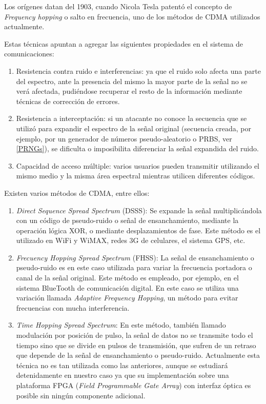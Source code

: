 Los orígenes datan del 1903, cuando Nicola Tesla patentó el concepto de \textit{Frequency hopping} o salto en frecuencia, uno de los métodos de CDMA utilizados actualmente.

Estas técnicas apuntan a agregar las siguientes propiedades en el sistema de comunicaciones:
\begin{enumerate} 
\item Resistencia contra ruido e interferencias: ya que el ruido solo afecta una parte del espectro, ante la presencia del mismo la mayor parte de la señal no se verá afectada, pudiéndose recuperar el resto de la información mediante técnicas de corrección de errores.
\item Resistencia a interceptación: si un atacante no conoce la secuencia que se utilizó para expandir el espectro de la señal original (secuencia creada, por ejemplo, por un generador de números pseudo-aleatorio o PRBS, ver \ref{PRNGs}), se dificulta o imposibilita diferenciar la señal expandida del ruido.
\item Capacidad de acceso múltiple: varios usuarios pueden transmitir utilizando el mismo medio y la misma área espectral mientras utilicen diferentes códigos.
\end{enumerate} 

Existen varios métodos de CDMA, entre ellos:
\begin{enumerate} 
\item \textit{Direct Sequence Spread Spectrum} (DSSS): Se expande la señal multiplicándola con un código de pseudo-ruido o señal de ensanchamiento, mediante la operación lógica XOR, o mediante desplazamientos de fase. Este método es el utilizado en WiFi y WiMAX, redes 3G de celulares, el sistema GPS, etc.
\item \textit{Frecuency Hopping Spread Spectrum} (FHSS): La señal de ensanchamiento o pseudo-ruido es en este caso utilizada para variar la frecuencia portadora o canal de la señal original. Este método es empleado, por ejemplo, en el sistema BlueTooth de comunicación digital. En este caso se utiliza una variación llamada \textit{Adaptive Frequency Hopping}, un método para evitar frecuencias con mucha interferencia.
\item \textit{Time Hopping Spread Spectrum}: En este método, también llamado modulación por posición de pulso, la señal de datos no se transmite todo el tiempo sino que se divide en pulsos de transmisión, que sufren de un retraso que depende de la señal de ensanchamiento o pseudo-ruido. Actualmente esta técnica no es tan utilizada como las anteriores, aunque se estudiará detenidamente en nuestro caso ya que su implementación sobre una plataforma FPGA (\textit{Field Programmable Gate Array}) con interfaz óptica es posible sin ningún componente adicional.
\end{enumerate} 


